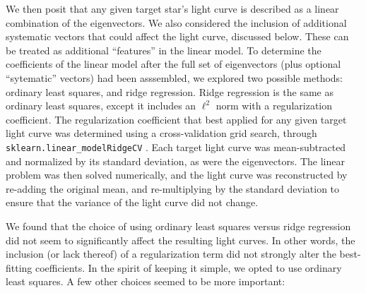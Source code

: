 \documentclass[12pt,twocolumn,tighten]{aastex63}
\begin{document}
We then posit that any given target star's light curve is described as
a linear combination of the eigenvectors.  We also considered the
inclusion of additional systematic vectors that could affect the light
curve, discussed below.  These can be treated as additional
``features'' in the linear model.  To determine the coefficients of
the linear model after the full set of eigenvectors (plus optional
``sytematic'' vectors) had been asssembled,  we explored two possible
methods: ordinary least squares, and ridge regression. Ridge
regression is the same as ordinary least squares, except it includes
an $\ell^2$ norm with a regularization coefficient. The regularization
coefficient that best applied for any given target light curve was
determined using a cross-validation grid search, through
\texttt{sklearn.linear\_modelRidgeCV} \citep{scikit-learn}.  Each
target light curve was mean-subtracted and normalized by its standard
deviation, as were the eigenvectors. The linear problem was then
solved numerically, and the light curve was reconstructed by re-adding
the original mean, and re-multiplying by the standard deviation to
ensure that the variance of the light curve did not change.

We found that the choice of using ordinary least squares versus ridge
regression did not seem to significantly affect the resulting light
curves. In other words, the inclusion (or lack thereof) of a
regularization term did not strongly alter the best-fitting
coefficients.  In the spirit of keeping it simple, we opted to use
ordinary least squares.  A few other choices seemed to be more
important:
\end{document}
